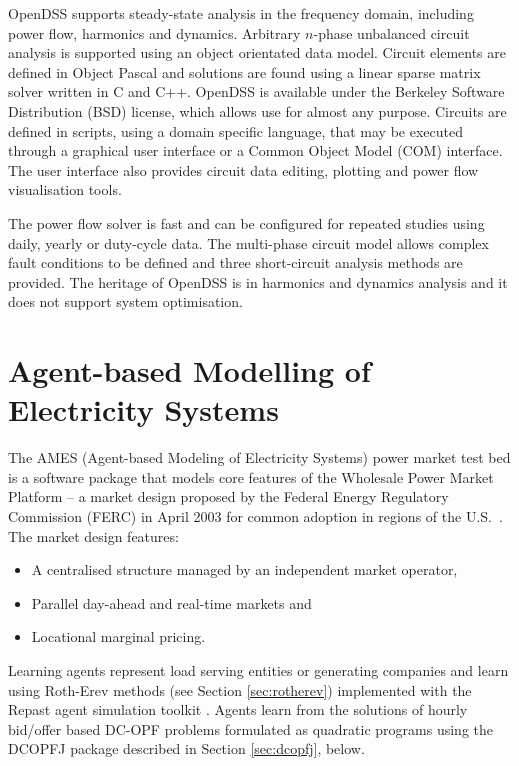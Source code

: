 OpenDSS supports steady-state analysis in the frequency domain, including power
flow, harmonics and dynamics.  Arbitrary $n$-phase unbalanced circuit analysis
is supported using an object orientated data model.  Circuit elements are defined in Object Pascal and solutions are found using a linear sparse matrix solver written in C and
C++.  OpenDSS is available under the Berkeley Software Distribution (BSD)
license, which allows use for almost any purpose.  Circuits are defined in
scripts, using a domain specific language, that may be executed through a
graphical user interface or a Common Object Model (COM) interface.  The user
interface also provides circuit data editing, plotting and power flow
visualisation tools.

The power flow solver is fast and can be configured for repeated
studies using daily, yearly or duty-cycle data.  The multi-phase circuit model allows
complex fault conditions to be defined and three short-circuit analysis methods
are provided.  The heritage of OpenDSS is in harmonics and dynamics analysis
and it does not support system optimisation.

\section{Agent-based Modelling of Electricity Systems}
\label{sec:ames}
The AMES (Agent-based Modeling of Electricity Systems) power market test bed is
a software package that models core features of the Wholesale Power Market
Platform -- a market design proposed by the Federal Energy Regulatory
Commission (FERC) in April 2003 for common adoption in regions of the
U.S.~\cite{tesfatsi:wpmp}. The market design features:
\begin{itemize}
  \item A centralised structure managed by an independent market operator,
  \item Parallel day-ahead and real-time markets and
  \item Locational marginal pricing.
\end{itemize}
Learning agents represent load serving entities or generating companies and
learn using Roth-Erev methods (see Section \ref{sec:rotherev})
implemented with the Repast agent simulation toolkit \cite{gieseler:thesis}.
Agents learn from the solutions of hourly bid/offer based
DC-OPF problems formulated as quadratic programs using the DCOPFJ package
\cite{tesfatsi:dcopf} described in Section \ref{sec:dcopfj}, below.

